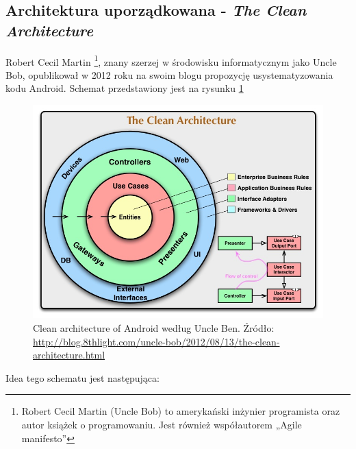 \subsection{Architektura uporządkowana - \textit{The Clean Architecture}}
Robert Cecil Martin \footnote{Robert Cecil Martin (Uncle Bob) to amerykański inżynier programista oraz autor książek o programowaniu. Jest również współautorem „Agile manifesto”}, znany szerzej w środowisku informatycznym jako Uncle Bob, opublikował w 2012 roku na swoim blogu propozycję usystematyzowania kodu Android. Schemat przedstawiony jest na rysunku \ref{fig:clean_architecture}

\begin{figure}[!htb]
    \centering
    \includegraphics[width=13cm]{imgs/ch4_clean_architecture.jpg}
    \caption
{Clean architecture of Android według Uncle Ben. Źródło: \url{http://blog.8thlight.com/uncle-bob/2012/08/13/the-clean-architecture.html}}
    \label{fig:clean_architecture}
\end{figure} 

Idea tego schematu jest następująca:

